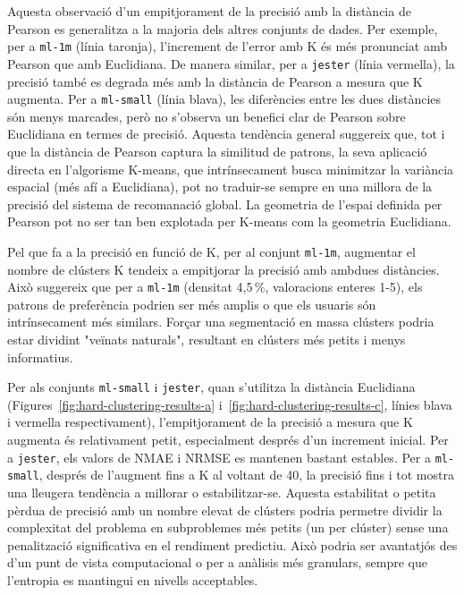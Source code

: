 \documentclass[a4paper,12pt]{report}
\begin{document}
Aquesta observació d'un empitjorament de la precisió amb la distància de Pearson es generalitza a la majoria dels altres conjunts de dades. Per exemple, per a \texttt{ml-1m} (línia taronja), l'increment de l'error amb K és més pronunciat amb Pearson que amb Euclidiana. De manera similar, per a \texttt{jester} (línia vermella), la precisió també es degrada més amb la distància de Pearson a mesura que K augmenta. Per a \texttt{ml-small} (línia blava), les diferències entre les dues distàncies són menys marcades, però no s'observa un benefici clar de Pearson sobre Euclidiana en termes de precisió. Aquesta tendència general suggereix que, tot i que la distància de Pearson captura la similitud de patrons, la seva aplicació directa en l'algorisme K-means, que intrínsecament busca minimitzar la variància espacial (més afí a Euclidiana), pot no traduir-se sempre en una millora de la precisió del sistema de recomanació global. La geometria de l'espai definida per Pearson pot no ser tan ben explotada per K-means com la geometria Euclidiana.

Pel que fa a la precisió en funció de K, per al conjunt \texttt{ml-1m}, augmentar el nombre de clústers K tendeix a empitjorar la precisió amb ambdues distàncies. Això suggereix que per a \texttt{ml-1m} (densitat 4,5\,\%, valoracions enteres 1-5), els patrons de preferència podrien ser més amplis o que els usuaris són intrínsecament més similars. Forçar una segmentació en massa clústers podria estar dividint "veïnats naturals", resultant en clústers més petits i menys informatius.

Per als conjunts \texttt{ml-small} i \texttt{jester}, quan s'utilitza la distància Euclidiana (Figures~\ref{fig:hard-clustering-results-a} i~\ref{fig:hard-clustering-results-c}, línies blava i vermella respectivament), l'empitjorament de la precisió a mesura que K augmenta és relativament petit, especialment després d'un increment inicial. Per a \texttt{jester}, els valors de NMAE i NRMSE es mantenen bastant estables. Per a \texttt{ml-small}, després de l'augment fins a K al voltant de 40, la precisió fins i tot mostra una lleugera tendència a millorar o estabilitzar-se. Aquesta estabilitat o petita pèrdua de precisió amb un nombre elevat de clústers podria permetre dividir la complexitat del problema en subproblemes més petits (un per clúster) sense una penalització significativa en el rendiment predictiu. Això podria ser avantatjós des d'un punt de vista computacional o per a anàlisis més granulars, sempre que l'entropia es mantingui en nivells acceptables.
\end{document}
